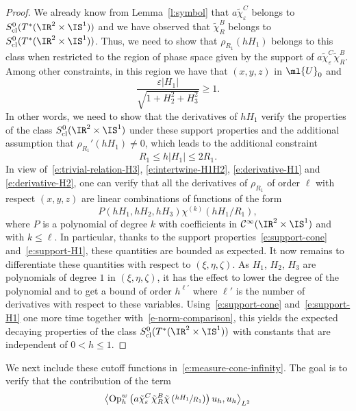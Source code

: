 \documentclass[JEP,XML,SOM,Unicode, NoEqCountersInSection,published]{cedram}
\theoremstyle{plain}
\theoremstyle{definition}
\theoremstyle{remark}
\newcommand{\Op}{\operatorname{Op}}
\begin{document}
\begin{proof}
We already know from Lemma~\ref{l:symbol} that $a\tilde{\chi}_\varepsilon^C$ belongs to $S_{\operatorname{cl}}^0(T^*(\IR^2\times\IS^1))$ and we have observed that $\tilde{\chi}_R^B$ belongs to $S_{\operatorname{cl}}^0(T^*(\IR^2\times\IS^1))$. Thus, we need to show that $\rho_{R_1}(hH_1)$ belongs to this class when restricted to the region of phase space given by the support of $a\tilde{\chi}_\varepsilon^C\tilde{\chi}_R^B$. Among other constraints, in this region we have that $(x,y,z)$ in $\ml{U}_0$ and
\begin{equation}\label{e:support-cone}
\frac{\varepsilon |H_1|}{\sqrt{1+H_2^2+H_3^2}}\geq 1.
\end{equation}
In other words, we need to show that the derivatives of $hH_1$ verify the properties of the class $S^{0}_{\textup{cl}}(\IR^2\times\IS^1)$ under these support properties and the additional assumption that $\rho_{R_1}'(hH_1)\neq 0$, which leads to the additional constraint
\begin{equation}\label{e:support-H1}
R_1\leq h|H_1|\leq 2R_1.
\end{equation}
In view of~\eqref{e:trivial-relation-H3}, \eqref{e:intertwine-H1H2}, \eqref{e:derivative-H1} and \eqref{e:derivative-H2}, one can verify that all the derivatives of $\rho_{R_1}$ of order $\ell$ with respect $(x,y,z)$ are linear combinations of functions of the form
\[
P(hH_1,hH_2,hH_3)\chi^{(k)}(hH_1/R_1),
\]
where $P$ is a polynomial of degree $k$ with coefficients in $\mathcal{C}^{\infty}(\IR^2\times\IS^1)$ and with $k\leq \ell$. In particular, thanks to the support properties~\eqref{e:support-cone} and~\eqref{e:support-H1}, these quantities are bounded as expected. It now remains to differentiate these quantities with respect to $(\xi,\eta,\zeta)$. As $H_1$, $H_2$, $H_3$ are polynomials of degree $1$ in $(\xi,\eta,\zeta)$, it has the effect to lower the degree of the polynomial and to get a bound of order $h^{\ell'}$ where $\ell'$ is the number of derivatives with respect to these variables. Using~\eqref{e:support-cone} and~\eqref{e:support-H1} one more time together with~\eqref{e-norm-comparison}, this yields the expected decaying properties of the class $S_{\operatorname{cl}}^0(T^*(\IR^2\times\IS^1))$ with constants that are independent of $0<h\leq 1$.
\end{proof}
We next include these cutoff functions in~\eqref{e:measure-cone-infinity}. The goal is to verify that the contribution of the term
\begin{equation}%
\left\langle \Op_h^w\left(a\tilde{\chi}_\varepsilon^C\tilde{\chi}_R^B\tilde{\chi}\left(\sfrac{hH_1}{R_1}\right)\right)u_h,u_h\right\rangle_{L^2}
\end{equation}
\end{document}

